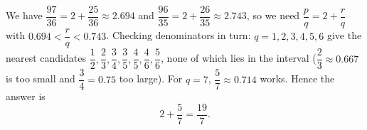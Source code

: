 We have $\dfrac{97}{36}=2+\dfrac{25}{36}\approx 2.694$ and $\dfrac{96}{35}=2+\dfrac{26}{35}\approx2.743$, so we need $\dfrac{p}{q}=2+\dfrac{r}{q}$ with $0.694<\dfrac {r}{q}<0.743$.
Checking denominators in turn: $q=1,2,3,4,5,6$ give the nearest candidates $\dfrac{1}{2},\dfrac{2}{3},\dfrac{3}{4},\dfrac{3}{5},\dfrac{4}{5},\dfrac{4}{6},\dfrac{5}{6}$, none of which lies in the interval ($\dfrac{2}{3}\approx0.667$ is too small and $\dfrac{3}{4}=0.75$ too large). For $q=7$, $\dfrac{5}{7}\approx0.714$ works. Hence the answer is
\[2+\dfrac{5}{7}=\boxed{\dfrac{19}{7}}.\]
